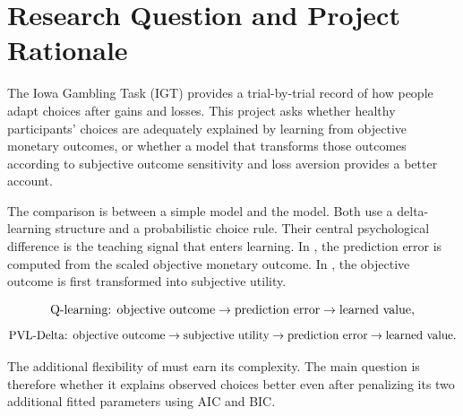 \section{Research Question and Project Rationale}

The Iowa Gambling Task (IGT) provides a trial-by-trial record of how people adapt choices after gains and losses. This project asks whether healthy participants' choices are adequately explained by learning from objective monetary outcomes, or whether a model that transforms those outcomes according to subjective outcome sensitivity and loss aversion provides a better account.

The comparison is between a simple \QL{} model and the \PVL{} model. Both use a delta-learning structure and a probabilistic choice rule. Their central psychological difference is the teaching signal that enters learning. In \QL{}, the prediction error is computed from the scaled objective monetary outcome. In \PVL{}, the objective outcome is first transformed into subjective utility.

\begin{equation}
    \text{Q-learning: objective outcome} \rightarrow \text{prediction error} \rightarrow \text{learned value},
\end{equation}
\begin{equation}
    \text{PVL-Delta: objective outcome} \rightarrow \text{subjective utility} \rightarrow \text{prediction error} \rightarrow \text{learned value}.
\end{equation}

The additional flexibility of \PVL{} must earn its complexity. The main question is therefore whether it explains observed choices better even after penalizing its two additional fitted parameters using AIC and BIC\@.
